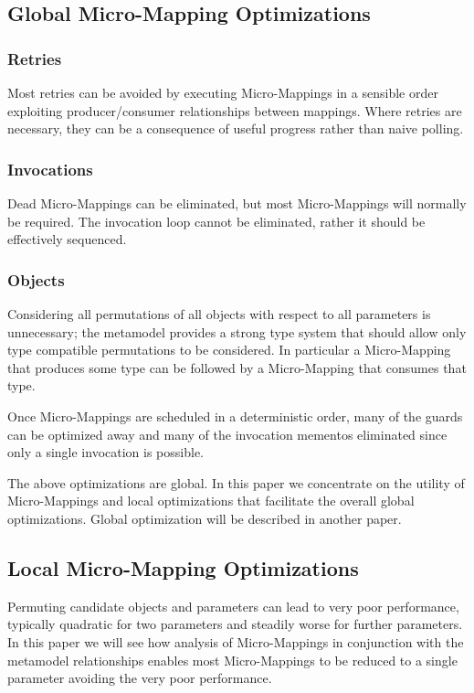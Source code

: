 \documentclass[conference]{IEEEtran}
\begin{document}
\subsection{Global Micro-Mapping Optimizations}\label{Global Micro-Mapping Optimizations}

\subsubsection{Retries}Most retries can be avoided by executing Micro-Mappings in a sensible order exploiting producer/consumer relationships between mappings. Where retries are necessary, they can be a consequence of useful progress rather than naive polling.

\subsubsection{Invocations}Dead Micro-Mappings can be eliminated, but most Micro-Mappings will normally be required. The invocation loop cannot be eliminated, rather it should be effectively sequenced.

\subsubsection{Objects}Considering all permutations of all objects with respect to all parameters is unnecessary; the metamodel provides a strong type system that should allow only type compatible permutations to be considered. In particular a Micro-Mapping that produces some type can be followed by a Micro-Mapping that consumes that type.

Once Micro-Mappings are scheduled in a deterministic order, many of the guards can be optimized away and many of the invocation mementos eliminated since only a single invocation is possible.

The above optimizations are global. In this paper we concentrate on the utility of Micro-Mappings and local optimizations that facilitate the overall global optimizations. Global optimization will be described in another paper.
  
\subsection{Local Micro-Mapping Optimizations}

Permuting candidate objects and parameters can lead to very poor performance, typically quadratic for two parameters and steadily worse for further parameters. In  this paper we will see how analysis of Micro-Mappings in conjunction with the metamodel relationships enables most Micro-Mappings to be reduced to a single parameter avoiding the very poor performance. %
\end{document}
